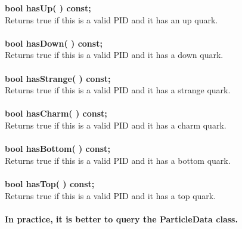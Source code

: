 \begin{tabbing}
\hspace{0.5in}  {\bf bool hasUp( )      const; }\\
\hspace{0.5in}  Returns true if this is a valid PID and it has an up quark. \\ \\
\hspace{0.5in}  {\bf bool hasDown( )    const; }\\
\hspace{0.5in}  Returns true if this is a valid PID and it has a down quark.\\ \\
\hspace{0.5in}  {\bf bool hasStrange( ) const; }\\
\hspace{0.5in}  Returns true if this is a valid PID and it has a strange quark.\\ \\
\hspace{0.5in}  {\bf bool hasCharm( )   const; }\\
\hspace{0.5in}  Returns true if this is a valid PID and it has a charm quark.\\ \\
\hspace{0.5in}  {\bf bool hasBottom( )  const; }\\
\hspace{0.5in}  Returns true if this is a valid PID and it has a bottom quark.\\ \\
\hspace{0.5in}  {\bf bool hasTop( )     const; }\\
\hspace{0.5in}  Returns true if this is a valid PID and it has a top quark.\\ \\
\hspace{0.5in}  {\bf In practice, it is better to query the ParticleData class.} \\ \\


\end{tabbing}
